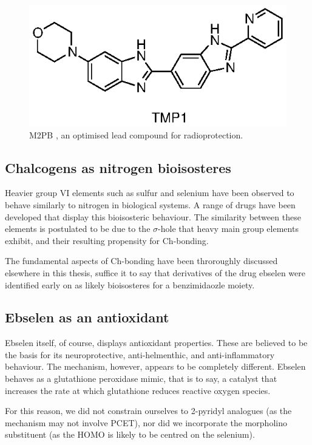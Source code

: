 \begin{refsection}
\begin{figure}
\includegraphics[scale=0.74]{Figures/m2pb.eps}
\caption{M2PB , an optimised lead compound for radioprotection.}
\label{fig:m2pb}
\end{figure}


\subsection{Chalcogens as nitrogen bioisosteres}
Heavier group VI elements such as sulfur and selenium have been observed to behave similarly to nitrogen in biological systems.
A range of drugs have been developed that display this bioisosteric behaviour\autocite{Beno2015}.
The similarity between these elements is postulated to be due to the $\sigma$-hole that heavy main group elements exhibit, and their resulting propensity for Ch-bonding.

The fundamental aspects of Ch-bonding have been throroughly discussed elsewhere in this thesis, suffice it to say that derivatives of the drug ebselen  were identified early on as likely bioisosteres for a benzimidaozle moiety.


\subsection{Ebselen as an antioxidant}
Ebselen itself, of course, displays antioxidant properties.
These are believed to be the basis for its neuroprotective, anti-helmenthic, and anti-inflammatory behaviour.\autocite{???}
The mechanism, however, appears to be completely different.
Ebselen behaves as a glutathione peroxidase mimic, that is to say, a catalyst that increases the rate at which glutathione reduces reactive oxygen species.

\label{sec:simplification}
For this reason, we did not constrain ourselves to 2-pyridyl analogues (as the mechanism may not involve PCET), nor did we incorporate the morpholino substituent (as the HOMO is likely to be centred on the selenium).


\end{refsection}
